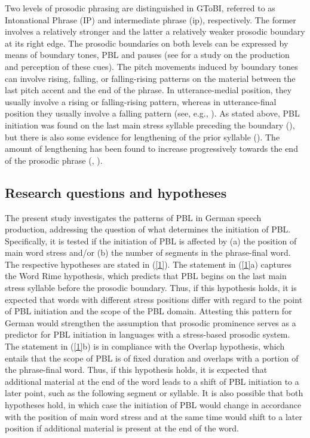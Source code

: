 \documentclass[output=paper]{langscibook}
\begin{document}
Two levels of prosodic phrasing are distinguished in GToBI, referred to as Intonational Phrase (IP) and intermediate phrase (ip), respectively. The former involves a relatively stronger and the latter a relatively weaker prosodic boundary at its right edge. The prosodic boundaries on both levels can be expressed by means of boundary tones, PBL and pauses (see \citealt{PetroneEtal2017} for a study on the production and perception of these cues). The pitch movements induced by boundary tones can involve rising, falling, or falling-rising patterns on the material between the last pitch accent and the end of the phrase. In utterance-medial position, they usually involve a rising or falling-rising pattern, whereas in utterance-final position they usually involve a falling pattern (see, e.g., \citealt{Truckenbrodt2002, Truckenbrodt2007}). As stated above, PBL initiation was found on the last main stress syllable preceding the boundary (\citealt{Kohler1983}), but there is also some evidence for lengthening of the prior syllable (\citealt{Silverman1990}). The amount of lengthening has been found to increase progressively towards the end of the prosodic phrase (\citealt{Kohler1983}, \citealt{Silverman1990}).

\subsection{Research questions and hypotheses}
The present study investigates the patterns of PBL in German speech production, addressing the question of what determines the initiation of PBL. Specifically, it is tested if the initiation of PBL is affected by (a) the position of main word stress and\slash or (b) the number of segments in the phrase-final word. The respective hypotheses are stated in (\ref{1}). The statement in (\ref{1}a) captures the Word Rime hypothesis, which predicts that PBL begins on the last main stress syllable before the prosodic boundary. Thus, if this hypothesis holds, it is expected that words with different stress positions differ with regard to the point of PBL initiation and the scope of the PBL domain. Attesting this pattern for German would strengthen the assumption that prosodic prominence serves as a predictor for PBL initiation in languages with a stress-based prosodic system. The statement in (\ref{1}b) is in compliance with the Overlap hypothesis, which entails that the scope of PBL is of fixed duration and overlaps with a portion of the phrase-final word. Thus, if this hypothesis holds, it is expected that additional material at the end of the word leads to a shift of PBL initiation to a later point, such as the following segment or syllable. It is also possible that both hypotheses hold, in which case the initiation of PBL would change in accordance with the position of main word stress and at the same time would shift to a later position if additional material is present at the end of the word.
\end{document}

